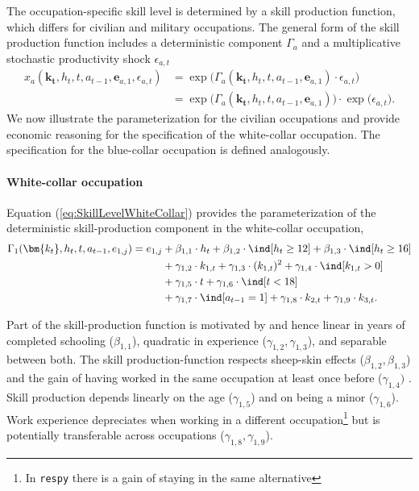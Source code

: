 The occupation-specific skill level is determined by a skill production function, which differs for civilian and military occupations. The general form of the skill production function includes a deterministic component $\Gamma_a$ and a multiplicative stochastic productivity shock $\epsilon_{a,t}$
%
\begin{align}\label{eq:OccupationSpecificSkillLevel}
    x_{a}(\bm{k_t}, h_t, t, a_{t-1}, \bm{e}_{a, 1}, \epsilon_{a,t}) & = \exp \big( \Gamma_{a}(\bm{k_t},  h_t, t, a_{t-1}, \bm{e}_{a,1}) \cdot \epsilon_{a,t} \big) \nonumber \\
                & = \exp \big( \Gamma_a(\bm{k_t},  h_t, t, a_{t-1}, \bm{e}_{a,1}) \big) \cdot \exp \big( \epsilon_{a,t} \big).
\end{align}
We now illustrate the parameterization for the civilian occupations and provide economic reasoning for the specification of the white-collar occupation. The specification for the blue-collar occupation is defined analogously.

\paragraph{White-collar occupation} Equation (\ref{eq:SkillLevelWhiteCollar}) provides the parameterization of the deterministic skill-production component in the white-collar occupation,
%
\begin{align}\label{eq:SkillLevelWhiteCollar}
    \Gamma_1(\bm{k_t}, h_t, t, a_{t-1}, e_{1,j}) = e_{1,j} & + \beta_{1,1} \cdot h_t + \beta_{1, 2} \cdot \ind[h_t \geq 12] + \beta_{1,3} \cdot \ind[h_t\geq 16] \nonumber\\
                                 \nonumber & + \gamma_{1, 2} \cdot  k_{1,t} + \gamma_{1,3} \cdot  (k_{1,t})^2 + \gamma_{1,4} \cdot  \ind[k_{1,t} > 0] \\
                                  \nonumber & + \gamma_{1,5} \cdot  t + \gamma_{1,6} \cdot \ind[t < 18] \nonumber\\
                                  & + \gamma_{1,7} \cdot \ind[a_{t-1} = 1] + \gamma_{1,8} \cdot  k_{2,t} + \gamma_{1,9} \cdot  k_{3,t}.
\end{align}
%

Part of the skill-production function is motivated by \citet{Mincer.1958, Mincer.1974} and hence linear in years of completed schooling ($\beta_{1,1}$), quadratic in experience ($\gamma_{1,2}, \gamma_{1,3}$), and separable between both. The skill production-function respects sheep-skin effects ($\beta_{1,2}, \beta_{1,3}$) and the gain of having worked in the same occupation at least once before ($\gamma_{1,4})$ \citep{Spence.1973, Arrow.1973, Hungerford.1987, Jaeger.1996}. Skill production depends linearly on the age ($\gamma_{1,5}$) and on being a minor ($\gamma_{1,6}$). Work experience depreciates when working in a different occupation\footnote{In \texttt{respy} there is a gain of staying in the same alternative} but is potentially transferable across occupations ($\gamma_{1,8}, \gamma_{1,9}$). \\


